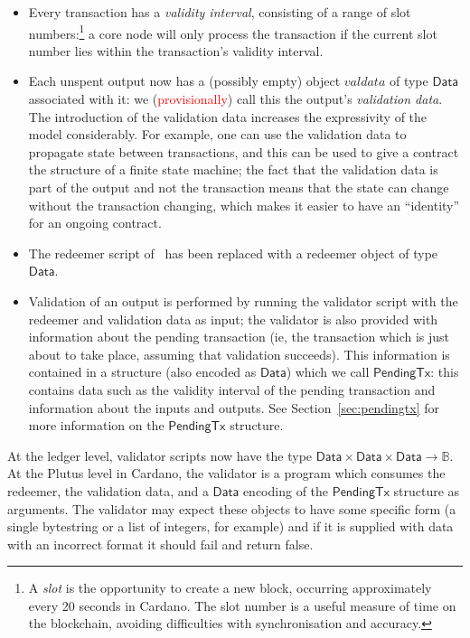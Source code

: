 \documentclass[a4paper]{article}
\newcounter{note}
\newcommand{\red}[1]{\textcolor{red}{#1}}
\newcommand{\s}{\textsf}  %
\newcommand{\false}{\textsf{false}}
\newcommand{\ptx}{\ensuremath{\s{PendingTx}}}
\newcommand{\mi}[1]{\ensuremath{\mathit{#1}}}
\newcommand{\valdata}{\mi{valdata}}
\newcommand{\Data}{\ensuremath{\mathsf{Data}}}
\newcommand\B{\ensuremath{\mathbb{B}}}
\begin{document}
\begin{itemize}
\item Every transaction has a \textit{validity interval}, consisting
  of a range of slot numbers:\footnote{A \textit{slot} is the
    opportunity to create a new block, occurring approximately every
    20 seconds in Cardano.  The slot number is a useful measure of
    time on the blockchain, avoiding difficulties with synchronisation
    and accuracy.} a core node will only process the transaction if
  the current slot number lies within the transaction's validity
  interval.

\item Each unspent output now has a (possibly empty) object $\valdata$ of type
  \Data{} associated with it: we (\red{provisionally}) call this the output's
  \textit{validation data}.  The introduction of the validation data
  increases the expressivity of the model considerably. For example,
  one can use the validation data to propagate state between
  transactions, and this can be used to give a contract the structure
  of a finite state machine; the fact that the validation data is part
  of the output and not the transaction means that the state can
  change without the transaction changing, which makes it easier to
  have an ``identity'' for an ongoing contract.

\item The redeemer script of~\citet{Zahnentferner18-UTxO} has been
  replaced with a redeemer object of type \Data.
  
\item Validation of an output is performed by running the validator
  script with the redeemer and validation data as input; the validator
  is also provided with information about the pending transaction (ie,
  the transaction which is just about to take place, assuming that
  validation succeeds). This information is contained in a structure
  (also encoded as \Data) which we call \ptx{}: this contains data
  such as the validity interval of the pending transaction and
  information about the inputs and outputs.  See
  Section~\ref{sec:pendingtx} for more information on the $\ptx$
  structure.
  
\end{itemize}


\noindent At the ledger level, validator scripts now have the type
$
\Data \times \Data \times \Data \rightarrow \B
$. At the Plutus level in Cardano, the validator is a program which
consumes the redeemer, the validation data, and a \Data{} encoding
of the $\ptx$ structure as arguments.  The validator may
expect these objects to have some specific form (a single bytestring
or a list of integers, for example) and if it is supplied with data
with an incorrect format it should fail and return \false.
\end{document}
